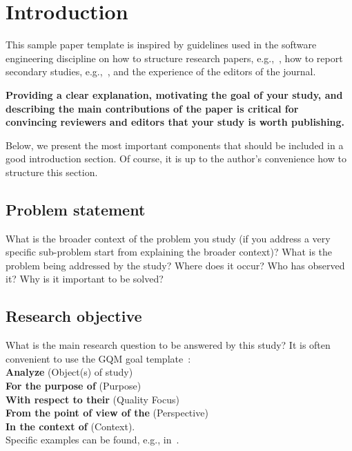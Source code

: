 \documentclass[]{einformatica}
\begin{document}
\maketitle 

\section{Introduction}\label{sec:Introduction}
This sample paper template is inspired by guidelines used in the software engineering discipline on how to structure research papers, e.g.,~\cite{Jedlitschka08,Wohlin12}, how to report secondary studies, e.g.,~\cite{KitchenhamMadeyskiBudgen23SEGRESS,KitchenhamMadeyskiBudgen23TSE}, and the experience of the editors of the journal.

\vspace{6pt}
\textbf{Providing a clear explanation, motivating the goal of your study, and describing the main contributions of the paper is critical for convincing reviewers and editors that your study is worth publishing.}
\vspace{6pt}

Below, we present the most important components that should be included in a good introduction section. Of course, it is up to the author's convenience how to structure this section. 

\subsection*{Problem statement} %
What is the broader context of the problem you study (if you address a very specific sub-problem start from explaining the broader context)?
What is the problem being addressed by the study? 
Where does it occur? 
Who has observed it?
Why is it important to be solved?\\

\subsection*{Research objective}
What is the main research question to be
answered by this study? It is often convenient to use the GQM goal template~\cite{Solingen99}:\\
\textbf{Analyze} (Object(s) of study)\\
\textbf{For the purpose of} (Purpose)\\
\textbf{With respect to their} (Quality Focus)\\
\textbf{From the point of view of the} (Perspective)\\
\textbf{In the context of} (Context).\\
Specific examples can be found, e.g., in~\cite{Jedlitschka08,Madeyski10}.
\end{document}
